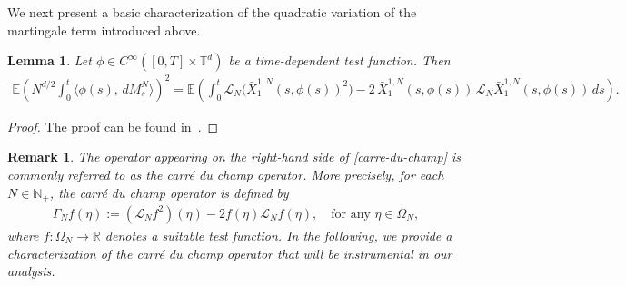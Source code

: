 \documentclass[UTF-8,reqno]{amsart}
\numberwithin{equation}{section}
\newtheorem{lemma}[theorem]{Lemma}
\newtheorem{remark}[theorem]{Remark}
\begin{document}
We next present a basic characterization of the quadratic variation of the martingale term introduced above.

\begin{lemma}\label{lem-carre-du-champ}
Let $\phi \in C^{\infty}([0,T] \times \mathbb{T}^d)$ be a time-dependent test function. Then
\begin{align}\label{carre-du-champ}
\mathbb{E} \left( N^{d/2} \int_0^t \langle \phi(s), \, dM^N_s \rangle \right)^2 
= \mathbb{E} \left( \int_0^t \mathcal{L}_N \big( \bar{X}^{1,N}_1(s, \phi(s))^2 \big) 
- 2 \, \bar{X}^{1,N}_1(s, \phi(s)) \, \mathcal{L}_N \bar{X}^{1,N}_1(s, \phi(s)) \, ds \right).
\end{align}
\end{lemma}

\begin{proof}
The proof can be found in~\cite[Appendix~1.5, page~330, Lemma~5.1]{KL99}.
\end{proof}

\begin{remark}
The operator appearing on the right-hand side of \eqref{carre-du-champ} is commonly referred to as the \emph{carr\'e du champ} operator. More precisely, for each $N\in\mathbb{N}_+$, the \emph{carr\'e du champ} operator is defined by
\begin{align}\label{def-carre-du-champ}
\Gamma_N f(\eta) := (\mathcal{L}_N f^2)(\eta) - 2 f(\eta) \mathcal{L}_N f(\eta), \quad \text{for any } \eta \in \Omega_N,
\end{align}
where $f\colon \Omega_N \to \mathbb{R}$ denotes a suitable test function. In the following, we provide a characterization of the carr\'e du champ operator that will be instrumental in our analysis.
\end{remark}
\end{document}
